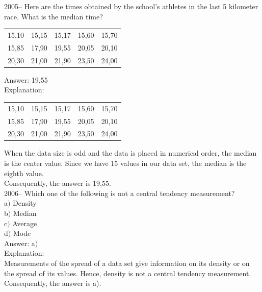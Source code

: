 \documentclass[letterpaper, 12pt]{article}
\begin{document}
2005-- Here are the times obtained by the school's athletes in the last 5 kilometer race. What is the median time?\\
\begin{center}

\begin{tabular}{|c  c  c  c  c|} \hline

15,10 & 15,15 & 15,17 & 15,60 & 15,70 \\
15,85 & 17,90 & 19,55 & 20,05 & 20,10 \\
20,30 & 21,00 & 21,90 & 23,50 & 24,00 \\ \hline

\end{tabular}
\end{center}

Answer: 19,55\\

Explanation:\\
\begin{center}

\begin{tabular}{|c  c  c  c  c|} \hline

15,10 & 15,15 & 15,17 & 15,60 & 15,70 \\
15,85 & 17,90 & 19,55 & 20,05 & 20,10 \\
20,30 & 21,00 & 21,90 & 23,50 & 24,00 \\ \hline

\end{tabular}
\end{center}
When the data size is odd and the data is placed in numerical order, the median is the center value. Since we have 15 values in our data set, the median is the eighth value. \\
Consequently, the answer is 19,55.\\


2006-- Which one of the following is not a central tendency measurement?\\

a$)$ Density\\
b$)$ Median\\
c$)$ Average\\
d$)$ Mode\\

Answer: a$)$\\

Explanation:\\
Measurements of the spread of a data set give information on its density or on the spread of its values. Hence, density is not a central tendency measurement.\\
Consequently, the answer is a).\\
\end{document}
